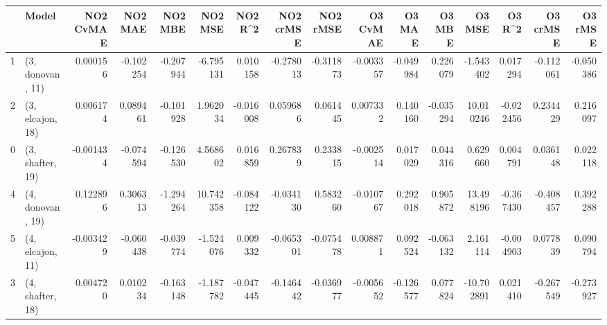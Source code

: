 \begin{tabular}{llrrrrrrrrrrrrrr}
\toprule
{} &             Model &  NO2 CvMAE &   NO2 MAE &   NO2 MBE &    NO2 MSE &   NO2 R\textasciicircum2 &  NO2 crMSE &  NO2 rMSE &  O3 CvMAE &    O3 MAE &    O3 MBE &     O3 MSE &    O3 R\textasciicircum2 &  O3 crMSE &   O3 rMSE \\
\midrule
1 &  (3, donovan, 11) &   0.000156 & -0.102254 & -0.207944 &  -6.795131 &  0.010158 &  -0.278013 & -0.311873 & -0.003357 & -0.049984 &  0.226079 &  -1.543402 &  0.017294 & -0.112061 & -0.050386 \\
2 &  (3, elcajon, 18) &   0.006174 &  0.089461 & -0.101928 &   1.962034 & -0.016008 &   0.059686 &  0.061445 &  0.007332 &  0.140160 & -0.035294 &  10.010246 & -0.022456 &  0.234429 &  0.216097 \\
0 &  (3, shafter, 19) &  -0.001434 & -0.074594 & -0.126530 &   4.568602 &  0.016859 &   0.267839 &  0.233815 & -0.002514 &  0.017029 &  0.044316 &   0.629660 &  0.004791 &  0.036148 &  0.022118 \\
4 &  (4, donovan, 19) &   0.122896 &  0.306313 & -1.294264 &  10.742358 & -0.084122 &  -0.034130 &  0.583260 & -0.010767 &  0.292018 &  0.905872 &  13.498196 & -0.367430 & -0.408457 &  0.392288 \\
5 &  (4, elcajon, 11) &  -0.003429 & -0.060438 & -0.039774 &  -1.524076 &  0.009332 &  -0.065301 & -0.075478 &  0.008871 &  0.092524 & -0.063132 &   2.161114 & -0.004903 &  0.077839 &  0.090794 \\
3 &  (4, shafter, 18) &   0.004720 &  0.010234 & -0.163148 &  -1.187782 & -0.047445 &  -0.146442 & -0.036977 & -0.005652 & -0.126577 &  0.077824 & -10.702891 &  0.021410 & -0.267549 & -0.273927 \\
\bottomrule
\end{tabular}
